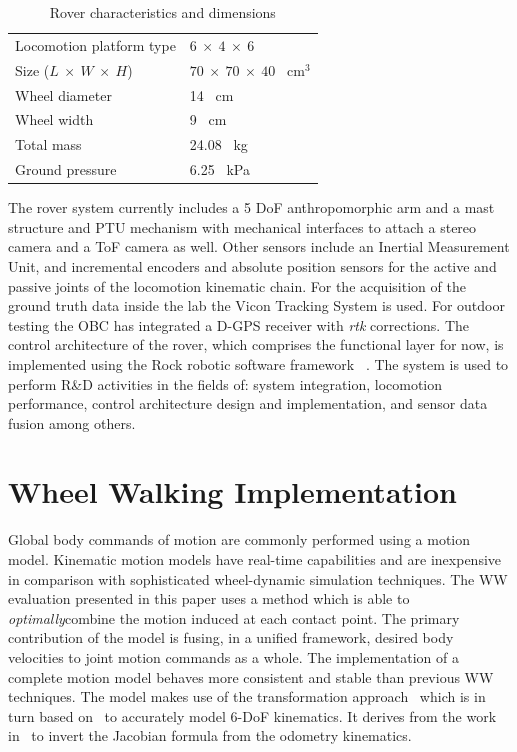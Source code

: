 \documentclass[a4paper,twocolumn]{esapub2005} %
\begin{document}
\begin{table}[h]
	\begin{tabular}{ll}
	Locomotion platform type       & $6~\times~4~\times~6$             \\
	Size ($L~\times~W~\times~H$)   & $70~\times~70~\times~40$ ~\unit{cm$^3$} \\
	Wheel diameter                 & 14 ~\unit{cm}    \\
	Wheel width                    & 9 ~\unit{cm}     \\
	Total mass                     & 24.08 ~\unit{kg} \\
	Ground pressure                & 6.25 ~\unit{kPa}        
	\end{tabular}
	\caption{Rover characteristics and dimensions}
	\label{tab:ExoterDimensionsTable}
\end{table}

The rover system currently includes a 5 DoF anthropomorphic arm and a mast structure and PTU mechanism with mechanical interfaces to attach a stereo camera and a ToF camera as well. Other sensors include an Inertial Measurement Unit, and incremental encoders and absolute position sensors for the active and passive joints of the locomotion kinematic chain. For the acquisition of the ground truth data inside the lab the Vicon Tracking System is used. For outdoor testing the OBC has integrated a D-GPS receiver with \textit{rtk} corrections. The control architecture of the rover, which comprises the functional layer for now, is implemented using the Rock robotic software framework ~\cite{}. The system is used to perform R\&D activities in the fields of: system integration, locomotion performance, control architecture design and implementation, and sensor data fusion among others. 

\section{Wheel Walking Implementation}

Global body commands of motion are commonly performed using a motion model.
Kinematic motion models have real-time capabilities and are inexpensive in
comparison with sophisticated wheel-dynamic simulation techniques.  The
WW evaluation presented in this paper uses a method which is able to
\textit{optimally}\footnotemark[1] combine the motion induced at each contact
point. The primary contribution of the model is fusing, in a unified framework,
desired body velocities to joint motion commands as a whole.  The
implementation of a complete motion model behaves more consistent and stable
than previous WW techniques. The model makes use of the
transformation approach~\cite{Tarokh2005} which is in turn based 
on~\cite{MuirNeumann1987} to accurately model 6-DoF kinematics.
It derives from the work in~\cite{Hidalgo-Carrio2014} to invert the Jacobian
formula from the odometry kinematics.
\end{document}
